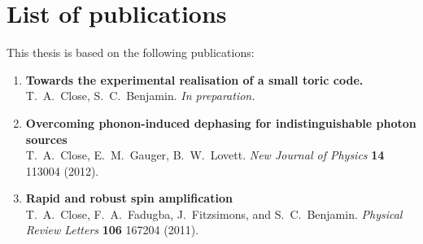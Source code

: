 
\section*{List of publications} 

This thesis is based on the following publications: %

\begin{enumerate}
\item \textbf{Towards the experimental realisation of a small toric code.} \\
  T.~A.~Close, S.~C.~Benjamin. \textit{In preparation.}

\item \textbf{Overcoming phonon-induced dephasing for indistinguishable photon sources} \\
  T.~A.~Close, E.~M.~Gauger, B.~W.~Lovett. \textit{New Journal of Physics} \textbf{14} 113004 (2012). 

\item \textbf{Rapid and robust spin amplification}\\
  T.~A.~Close, F.~A.~Fadugba, J.~Fitzsimons, and S.~C.~Benjamin.  \textit{Physical Review Letters} \textbf{106} 167204 (2011).


\end{enumerate}
